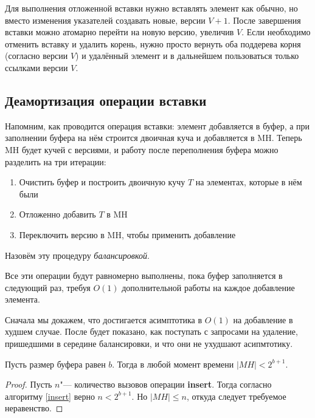 Для выполнения отложенной вставки нужно вставлять элемент как обычно, но вместо
изменения указателей создавать новые, версии $V+1$. После завершения вставки
можно атомарно перейти на новую версию, увеличив $V$. Если необходимо отменить
вставку и удалить корень, нужно просто вернуть оба поддерева корня (согласно версии
$V$) и удалённый элемент и в дальнейшем пользоваться только ссылками версии $V$.



\subsection{Деамортизация операции вставки}

Напомним, как проводится операция вставки: элемент добавляется в буфер,
а при заполнении буфера на нём строится двоичная куча и добавляется в
MH. Теперь MH будет кучей с версиями, и работу после переполнения буфера
можно разделить на три итерации:
\begin{enumerate}[label=\Roman*.]
\item Очистить буфер и построить двоичную кучу $T$ на элементах, которые в нём были
\item Отложенно добавить $T$ в MH
\item Переключить версию в MH, чтобы применить добавление
\end{enumerate}
Назовём эту процедуру \emph{балансировкой}.

Все эти операции будут равномерно выполнены, пока буфер заполняется в следующий
раз, требуя $O(1)$ дополнительной работы на каждое добавление элемента.

Сначала мы докажем, что достигается асимптотика в $O(1)$ на добавление в худшем
случае. После будет показано, как поступать с запросами на удаление, пришедшими
в середине балансировки, и что они не ухудшают асипмтотику.

\begin{theorem}\label{theo-mh-size}
Пусть размер буфера равен $b$. Тогда в любой момент времени $|MH| < 2^{b+1}$.
\end{theorem}
\begin{proof}
Пусть $n$"--- количество вызовов операции \textbf{insert}. Тогда
согласно алгоритму \ref{insert} верно $n < 2^{b+1}$. Но $|MH| \leq n$, откуда
следует требуемое неравенство.
\end{proof}

